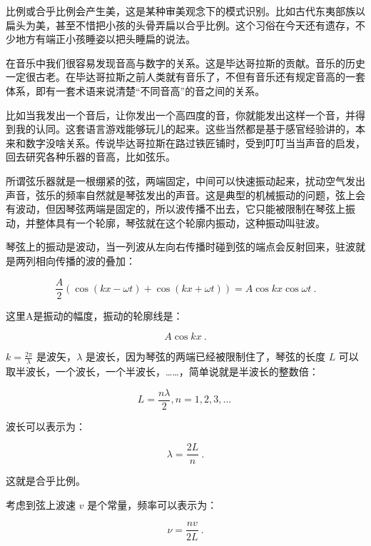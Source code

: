 比例或合乎比例会产生美，这是某种审美观念下的模式识别。比如古代东夷部族以扁头为美，甚至不惜把小孩的头骨弄扁以合乎比例。这个习俗在今天还有遗存，不少地方有端正小孩睡姿以把头睡扁的说法。

在音乐中我们很容易发现音高与数字的关系。这是毕达哥拉斯的贡献。音乐的历史一定很古老。在毕达哥拉斯之前人类就有音乐了，不但有音乐还有规定音高的一套体系，即有一套术语来说清楚“不同音高”的音之间的关系。

比如当我发出一个音后，让你发出一个高四度的音，你就能发出这样一个音，并得到我的认同。这套语言游戏能够玩儿的起来。这些当然都是基于感官经验讲的，本来和数字没啥关系。传说毕达哥拉斯在路过铁匠铺时，受到叮叮当当声音的启发，回去研究各种乐器的音高，比如弦乐。

所谓弦乐器就是一根绷紧的弦，两端固定，中间可以快速振动起来，扰动空气发出声音，弦乐的频率自然就是琴弦发出的声音。这是典型的机械振动的问题，弦上会有波动，但因琴弦两端是固定的，所以波传播不出去，它只能被限制在琴弦上振动，并整体具有一个轮廓，琴弦就在这个轮廓内振动，这种振动叫驻波。

琴弦上的振动是波动，当一列波从左向右传播时碰到弦的端点会反射回来，驻波就是两列相向传播的波的叠加：

\begin{equation}
\frac{A}{2} \left( \cos ( kx - \omega t ) + \cos ( kx + \omega t ) \right) = A \cos kx \cos \omega t~.
\end{equation}

这里A是振动的幅度，振动的轮廓线是：

\begin{equation}
A \cos kx ~.
\end{equation}

$k = \frac{2 \pi}{\lambda}$ 是波矢，$\lambda$ 是波长，因为琴弦的两端已经被限制住了，琴弦的长度 $L$ 可以取半波长，一个波长，一个半波长，……，简单说就是半波长的整数倍：

\begin{equation}
L = \frac{n \lambda}{2}, n = 1, 2, 3, ...~
\end{equation}

波长可以表示为：

\begin{equation}
\lambda = \frac{2L}{n}~.
\end{equation}

这就是合乎比例。

考虑到弦上波速 $v$ 是个常量，频率可以表示为：

\begin{equation}
\nu = \frac{n v}{2 L }~.
\end{equation}

